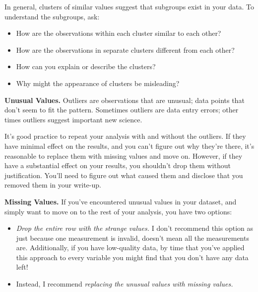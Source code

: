 \documentclass{article}
\begin{document}
In general, clusters of similar values suggest that subgroups exist in your data. To understand the subgroups, ask:

\begin{itemize}
	\item How are the observations within each cluster similar to each other?
	\item How are the observations in separate clusters different from each other?
	\item How can you explain or describe the clusters?
	\item Why might the appearance of clusters be misleading?
\end{itemize}

\textbf{Unusual Values.} Outliers are observations that are unusual; data points that don’t seem to fit the pattern. Sometimes outliers are data entry errors; other times outliers suggest important new science.

It’s good practice to repeat your analysis with and without the outliers. If they have minimal effect on the results, and you can’t figure out why they’re there, it’s reasonable to replace them with missing values and move on. However, if they have a substantial effect on your results, you shouldn’t drop them without justification. You’ll need to figure out what caused them and disclose that you removed them in your write-up.

\textbf{Missing Values.} If you’ve encountered unusual values in your dataset, and simply want to move on to the rest of your analysis, you have two options:

\begin{itemize}
\item \textit{Drop the entire row with the strange values.} I don’t recommend this option as just because one measurement is invalid, doesn’t mean all the measurements are. Additionally, if you have low-quality data, by time that you’ve applied this approach to every variable you might find that you don’t have any data left!
\item Instead, I recommend \textit{replacing the unusual values with missing values.}
\end{itemize}
\end{document}

